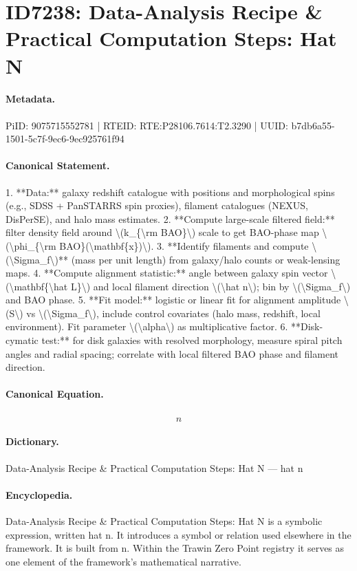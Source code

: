 \section*{ID7238: Data-Analysis Recipe \& Practical Computation Steps: Hat N}
\paragraph{Metadata.}
PiID: 9075715552781 | RTEID: RTE:P28106.7614:T2.3290 | UUID: b7db6a55-1501-5c7f-9ec6-9ec925761f94

\paragraph{Canonical Statement.}
1. **Data:** galaxy redshift catalogue with positions and morphological spins (e.g., SDSS + PanSTARRS spin proxies), filament catalogues (NEXUS, DisPerSE), and halo mass estimates. 2. **Compute large-scale filtered field:** filter density field around \textbackslash{}(k\_\{\textbackslash{}rm BAO\}\textbackslash{}) scale to get BAO-phase map \textbackslash{}(\textbackslash{}phi\_\{\textbackslash{}rm BAO\}(\textbackslash{}mathbf\{x\})\textbackslash{}). 3. **Identify filaments and compute \textbackslash{}(\textbackslash{}Sigma\_f\textbackslash{})** (mass per unit length) from galaxy/halo counts or weak-lensing maps. 4. **Compute alignment statistic:** angle between galaxy spin vector \textbackslash{}(\textbackslash{}mathbf\{\textbackslash{}hat L\}\textbackslash{}) and local filament direction \textbackslash{}(\textbackslash{}hat n\textbackslash{}); bin by \textbackslash{}(\textbackslash{}Sigma\_f\textbackslash{}) and BAO phase. 5. **Fit model:** logistic or linear fit for alignment amplitude \textbackslash{}(S\textbackslash{}) vs \textbackslash{}(\textbackslash{}Sigma\_f\textbackslash{}), include control covariates (halo mass, redshift, local environment). Fit parameter \textbackslash{}(\textbackslash{}alpha\textbackslash{}) as multiplicative factor. 6. **Disk-cymatic test:** for disk galaxies with resolved morphology, measure spiral pitch angles and radial spacing; correlate with local filtered BAO phase and filament direction.

\paragraph{Canonical Equation.}
\[
\hat n
\]

\paragraph{Dictionary.}
Data-Analysis Recipe \& Practical Computation Steps: Hat N — hat n

\paragraph{Encyclopedia.}
Data-Analysis Recipe \& Practical Computation Steps: Hat N is a symbolic expression, written hat n. It introduces a symbol or relation used elsewhere in the framework. It is built from n. Within the Trawin Zero Point registry it serves as one element of the framework's mathematical narrative.

